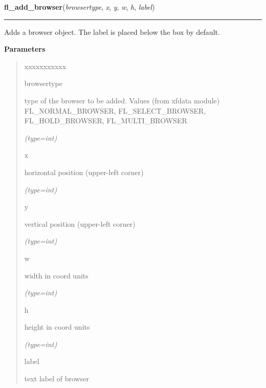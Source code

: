     \vspace{0.5ex}

\hspace{.8\funcindent}\begin{boxedminipage}{\funcwidth}

    \raggedright \textbf{fl\_add\_browser}(\textit{browsertype}, \textit{x}, \textit{y}, \textit{w}, \textit{h}, \textit{label})

    \vspace{-1.5ex}

    \rule{\textwidth}{0.5\fboxrule}
\setlength{\parskip}{2ex}
    Adds a browser object. The label is placed below the box by default.

\setlength{\parskip}{1ex}
      \textbf{Parameters}
      \vspace{-1ex}

      \begin{quote}
        \begin{Ventry}{xxxxxxxxxxx}

          \item[browsertype]

          type of the browser to be added. Values (from xfdata module) 
          FL\_NORMAL\_BROWSER, FL\_SELECT\_BROWSER, FL\_HOLD\_BROWSER, 
          FL\_MULTI\_BROWSER

            {\it (type=int)}

          \item[x]

          horizontal position (upper-left corner)

            {\it (type=int)}

          \item[y]

          vertical position (upper-left corner)

            {\it (type=int)}

          \item[w]

          width in coord units

            {\it (type=int)}

          \item[h]

          height in coord units

            {\it (type=int)}

          \item[label]

          text label of browser


\end{Ventry}
\end{quote}
\end{boxedminipage}
